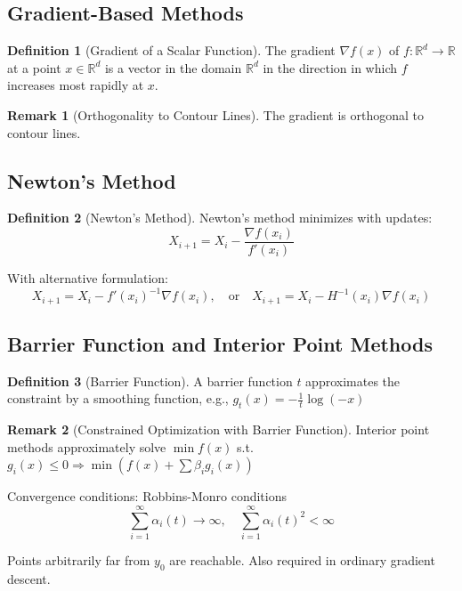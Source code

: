 \documentclass[12pt,a4paper]{article}
\theoremstyle{definition}
\newtheorem{definition}{Definition}[section]
\newtheorem{remark}{Remark}[section]
\begin{document}
\subsection{Gradient-Based Methods}

\begin{definition}[Gradient of a Scalar Function]
The gradient $\nabla f(x)$ of $f: \mathbb{R}^d \to \mathbb{R}$ at a point $x \in \mathbb{R}^d$ is a vector in the domain $\mathbb{R}^d$ in the direction in which $f$ increases most rapidly at $x$.
\end{definition}

\begin{remark}[Orthogonality to Contour Lines]
The gradient is orthogonal to contour lines.
\end{remark}

\subsection{Newton's Method}

\begin{definition}[Newton's Method]
Newton's method minimizes with updates:
\[
X_{i+1} = X_i - \frac{\nabla f(x_i)}{f'(x_i)}
\]

With alternative formulation:
\[
X_{i+1} = X_i - f'(x_i)^{-1} \nabla f(x_i), \quad \text{or} \quad X_{i+1} = X_i - H^{-1}(x_i) \nabla f(x_i)
\]
\end{definition}

\subsection{Barrier Function and Interior Point Methods}

\begin{definition}[Barrier Function]
A barrier function $t$ approximates the constraint by a smoothing function, e.g., $g_t(x) = -\frac{1}{t} \log(-x)$
\end{definition}

\begin{remark}[Constrained Optimization with Barrier Function]
Interior point methods approximately solve $\min f(x)$ s.t. $g_i(x) \leq 0 \Rightarrow \min(f(x) + \sum \beta_i g_i(x))$

Convergence conditions: Robbins-Monro conditions
\[
\sum_{i=1}^{\infty} \alpha_i(t) \to \infty, \quad \sum_{i=1}^{\infty} \alpha_i(t)^2 < \infty
\]

Points arbitrarily far from $y_0$ are reachable. Also required in ordinary gradient descent.
\end{remark}
\end{document}
